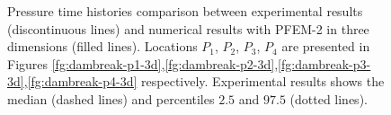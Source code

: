 \begin{figure}[h]
{    }
   \caption{Pressure time histories comparison between experimental results\cite{Lobovsky13} (discontinuous lines) and numerical results with PFEM-2 in three dimensions (filled lines). Locations $P_1$, $P_2$, $P_3$, $P_4$ are presented in Figures \ref{fg:dambreak-p1-3d},\ref{fg:dambreak-p2-3d},\ref{fg:dambreak-p3-3d},\ref{fg:dambreak-p4-3d} respectively. Experimental results shows the median (dashed lines) and percentiles $2.5$ and $97.5$ (dotted lines).}
   \label{fg:dambreak-p-3d}                %
\end{figure}
\clearpage

